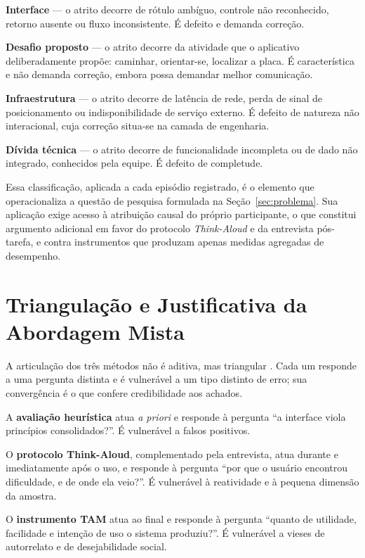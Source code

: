 \begin{alineas}
  \item \textbf{Interface} --- o atrito decorre de rótulo ambíguo, controle não
  reconhecido, retorno ausente ou fluxo inconsistente. É defeito e demanda
  correção.

  \item \textbf{Desafio proposto} --- o atrito decorre da atividade que o
  aplicativo deliberadamente propõe: caminhar, orientar-se, localizar a placa. É
  característica e não demanda correção, embora possa demandar melhor
  comunicação.

  \item \textbf{Infraestrutura} --- o atrito decorre de latência de rede, perda
  de sinal de posicionamento ou indisponibilidade de serviço externo. É defeito de
  natureza não interacional, cuja correção situa-se na camada de engenharia.

  \item \textbf{Dívida técnica} --- o atrito decorre de funcionalidade incompleta
  ou de dado não integrado, conhecidos pela equipe. É defeito de completude.
\end{alineas}

Essa classificação, aplicada a cada episódio registrado, é o elemento que
operacionaliza a questão de pesquisa formulada na Seção~\ref{sec:problema}. Sua
aplicação exige acesso à atribuição causal do próprio participante, o que
constitui argumento adicional em favor do protocolo \textit{Think-Aloud} e da
entrevista pós-tarefa, e contra instrumentos que produzam apenas medidas
agregadas de desempenho.

\section{Triangulação e Justificativa da Abordagem Mista}
\label{sec:justificativa_mista}

A articulação dos três métodos não é aditiva, mas triangular
\cite{creswell2011}. Cada um responde a uma pergunta distinta e é vulnerável a um
tipo distinto de erro; sua convergência é o que confere credibilidade aos
achados.

\begin{alineas}
  \item A \textbf{avaliação heurística} atua \textit{a priori} e responde à
  pergunta ``a interface viola princípios consolidados?''. É vulnerável a falsos
  positivos.

  \item O \textbf{protocolo Think-Aloud}, complementado pela entrevista, atua
  durante e imediatamente após o uso, e responde à pergunta ``por que o usuário
  encontrou dificuldade, e de onde ela veio?''. É vulnerável à reatividade e à
  pequena dimensão da amostra.

  \item O \textbf{instrumento TAM} atua ao final e responde à pergunta ``quanto de
  utilidade, facilidade e intenção de uso o sistema produziu?''. É vulnerável a
  vieses de autorrelato e de desejabilidade social.
\end{alineas}

